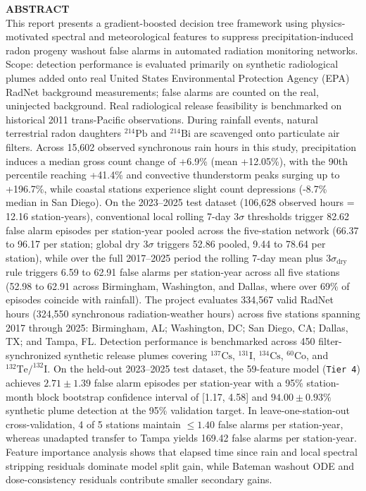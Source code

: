 \documentclass[11pt,a4paper]{article}
\begin{document}
\begin{framed}
\noindent\textbf{ABSTRACT}\\[0.6em]
This report presents a gradient-boosted decision tree framework using physics-motivated spectral and meteorological features to suppress precipitation-induced radon progeny washout false alarms in automated radiation monitoring networks. Scope: detection performance is evaluated primarily on synthetic radiological plumes added onto real United States Environmental Protection Agency (EPA) RadNet background measurements; false alarms are counted on the real, uninjected background. Real radiological release feasibility is benchmarked on historical 2011 trans-Pacific observations. During rainfall events, natural terrestrial radon daughters $^{214}\text{Pb}$ and $^{214}\text{Bi}$ are scavenged onto particulate air filters. Across 15,602 observed synchronous rain hours in this study, precipitation induces a median gross count change of +6.9\% (mean +12.05\%), with the 90th percentile reaching +41.4\% and convective thunderstorm peaks surging up to +196.7\%, while coastal stations experience slight count depressions (-8.7\% median in San Diego). On the 2023--2025 test dataset (106,628 observed hours = 12.16 station-years), conventional local rolling 7-day $3\sigma$ thresholds trigger 82.62 false alarm episodes per station-year pooled across the five-station network (66.37 to 96.17 per station; global dry $3\sigma$ triggers 52.86 pooled, 9.44 to 78.64 per station), while over the full 2017--2025 period the rolling 7-day mean plus $3\sigma_{\text{dry}}$ rule triggers 6.59 to 62.91 false alarms per station-year across all five stations (52.98 to 62.91 across Birmingham, Washington, and Dallas, where over 69\% of episodes coincide with rainfall). The project evaluates 334,567 valid RadNet hours (324,550 synchronous radiation-weather hours) across five stations spanning 2017 through 2025: Birmingham, AL; Washington, DC; San Diego, CA; Dallas, TX; and Tampa, FL. Detection performance is benchmarked across 450 filter-synchronized synthetic release plumes covering $^{137}\text{Cs}$, $^{131}\text{I}$, $^{134}\text{Cs}$, $^{60}\text{Co}$, and $^{132}\text{Te}/^{132}\text{I}$. On the held-out 2023--2025 test dataset, the 59-feature model (\texttt{Tier 4}) achieves $2.71 \pm 1.39$ false alarm episodes per station-year with a 95\% station-month block bootstrap confidence interval of [1.17, 4.58] and $94.00 \pm 0.93\%$ synthetic plume detection at the 95\% validation target. In leave-one-station-out cross-validation, 4 of 5 stations maintain $\le 1.40$ false alarms per station-year, whereas unadapted transfer to Tampa yields 169.42 false alarms per station-year. Feature importance analysis shows that elapsed time since rain and local spectral stripping residuals dominate model split gain, while Bateman washout ODE and dose-consistency residuals contribute smaller secondary gains.\\[0.6em]

\end{framed}
\end{document}
